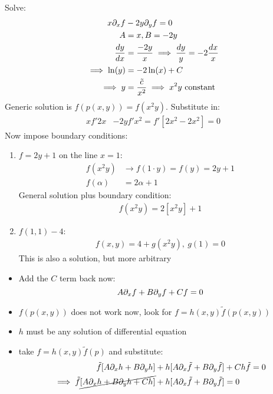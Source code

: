 \documentclass[Maths.tex]{subfiles}
\begin{document}
\begin{example}
Solve:
\begin{align*}
	x\partial_xf &- 2y\partial_yf = 0 \\
	A &= x, B = -2y \\
	\frac{dy}{dx} &= \frac{-2y}{x} \implies \frac{dy}{y} = -2\frac{dx}{x} \\
	\implies \ln(y) &= -2\ln(x) + C \\
	\implies y &= \frac{\tilde{c}}{x^2} \implies x^2y \text{ constant}
\end{align*}
Generic solution is $f(p(x,y)) = f(x^2y)$. Substitute in:
\begin{align*}
	xf'2x &- 2yf'x^2 = f'[2x^2 - 2x^2] = 0
\end{align*}
Now impose boundary conditions:
\begin{enumerate}
	\item $f=2y+1$ on the line $x=1$:
	\begin{align*}
		f(x^2y) &\to f(1\cdot y) = f(y) = 2y+1 \\
		f(\alpha) &= 2\alpha + 1
	\end{align*}
	General solution plus boundary condition:
	\begin{align*}
		f(x^2y) = 2[x^2y] + 1
	\end{align*}
	\item $f(1,1) - 4$:
	\begin{align*}
		f(x,y) = 4 + g(x^2y),~ g(1) = 0
	\end{align*}
	This is also a solution, but more arbitrary
\end{enumerate}
\end{example}

\begin{itemize}
	\item Add the $C$ term back now:
	\begin{equation*}
		A\partial_xf + B\partial_yf + Cf = 0
	\end{equation*}
	\item $f(p(x,y))$ does not work now, look for $f = h(x,y)\tilde{f}(p(x,y))$
	\item $h$ must be any solution of differential equation
	\item take $f = h(x,y)\tilde{f}(p)$ and substitute:
	\begin{align*}
		\tilde{f}[A\partial_xh + B\partial_yh] &+ h[A\partial_x\tilde{f} + B\partial_y\tilde{f}] + Ch\tilde{f} = 0 \\
		\implies \tilde{f}\cancel{[A\partial_xh + B\partial_yh + Ch]} &+ h[A\partial_x\tilde{f} + B\partial_y\tilde{f}] = 0
	\end{align*}
\end{itemize}
\end{document}
